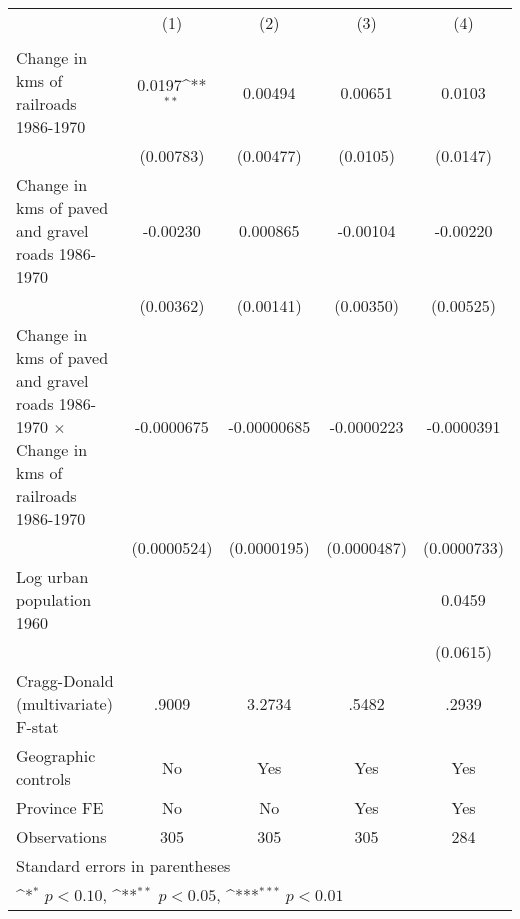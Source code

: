 {
\def\sym#1{\ifmmode^{#1}\else\(^{#1}\)\fi}
\begin{tabular}{l*{4}{c}}
\hline\hline
                &\multicolumn{1}{c}{(1)}&\multicolumn{1}{c}{(2)}&\multicolumn{1}{c}{(3)}&\multicolumn{1}{c}{(4)}\\
                &\multicolumn{1}{c}{}&\multicolumn{1}{c}{}&\multicolumn{1}{c}{}&\multicolumn{1}{c}{}\\
\hline
Change in kms of railroads 1986-1970&   0.0197\sym{**} &  0.00494         &  0.00651         &   0.0103         \\
                &(0.00783)         &(0.00477)         & (0.0105)         & (0.0147)         \\
[1em]
Change in kms of paved and gravel roads 1986-1970& -0.00230         & 0.000865         & -0.00104         & -0.00220         \\
                &(0.00362)         &(0.00141)         &(0.00350)         &(0.00525)         \\
[1em]
Change in kms of paved and gravel roads 1986-1970 $\times$ Change in kms of railroads 1986-1970&-0.0000675         &-0.00000685         &-0.0000223         &-0.0000391         \\
                &(0.0000524)         &(0.0000195)         &(0.0000487)         &(0.0000733)         \\
[1em]
Log urban population 1960&                  &                  &                  &   0.0459         \\
                &                  &                  &                  & (0.0615)         \\
\hline
Cragg-Donald (multivariate) F-stat&    .9009         &   3.2734         &    .5482         &    .2939         \\
Geographic controls&       No         &      Yes         &      Yes         &      Yes         \\
Province FE     &       No         &       No         &      Yes         &      Yes         \\
Observations    &      305         &      305         &      305         &      284         \\
\hline\hline
\multicolumn{5}{l}{\footnotesize Standard errors in parentheses}\\
\multicolumn{5}{l}{\footnotesize \sym{*} \(p<0.10\), \sym{**} \(p<0.05\), \sym{***} \(p<0.01\)}\\
\end{tabular}
}
